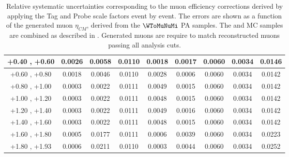 \begin{table}[h!]
{\begin{tabular}{|c|*8c|}
    \hline
    +0.40 , +0.60 & 0.0026 & 0.0058 & 0.0110 & 0.0018 & 0.0017 & 0.0060 & 0.0034 & 0.0146\\
    \hline
    +0.60 , +0.80 & 0.0018 & 0.0046 & 0.0110 & 0.0028 & 0.0006 & 0.0060 & 0.0034 & 0.0142\\
    \hline
    +0.80 , +1.00 & 0.0003 & 0.0022 & 0.0111 & 0.0049 & 0.0015 & 0.0060 & 0.0034 & 0.0142\\
    \hline
    +1.00 , +1.20 & 0.0003 & 0.0022 & 0.0111 & 0.0048 & 0.0015 & 0.0060 & 0.0034 & 0.0142\\
    \hline
    +1.20 , +1.40 & 0.0003 & 0.0022 & 0.0111 & 0.0049 & 0.0016 & 0.0060 & 0.0034 & 0.0142\\
    \hline
    +1.40 , +1.60 & 0.0003 & 0.0022 & 0.0111 & 0.0048 & 0.0015 & 0.0060 & 0.0034 & 0.0142\\
    \hline
    +1.60 , +1.80 & 0.0005 & 0.0177 & 0.0111 & 0.0006 & 0.0039 & 0.0060 & 0.0034 & 0.0223\\
    \hline
    +1.80 , +1.93 & 0.0006 & 0.0211 & 0.0110 & 0.0003 & 0.0044 & 0.0060 & 0.0034 & 0.0252\\
    \hline
  \end{tabular}
  }
  \caption{Relative systematic uncertainties corresponding to the muon efficiency corrections derived by applying the Tag and Probe scale factors event by event. The errors are shown as a function of the generated muon $\eta_{CM}$, derived from the $\WToMuNuMi$ PA \POWHEG samples. The \pPb and \Pbp MC samples are combined as described in . Generated muons are require to match reconstructed muons passing all analysis cuts.}
  \label{tab:tnpSystUncertainty_WToMu_Minus_PA}
\end{table}


